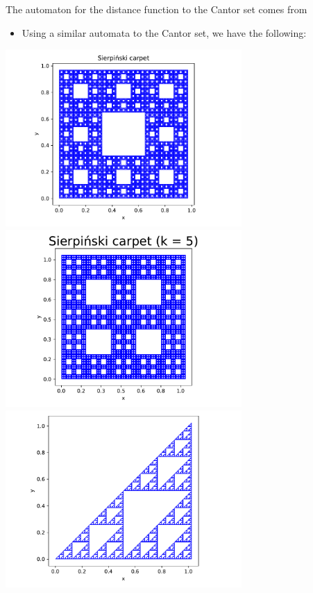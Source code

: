 \documentclass[landscape,usenames,dvipsnames]{sciposter}
\begin{document}
\begin{multicols}{3}
{ \footnotesize The automaton for the distance function to the Cantor set comes from \cite{gorman2019continuous} }

\begin{itemize}
    \item Using a similar automata to the Cantor set, we have the following:
\end{itemize}
    
\begin{center}
    \includegraphics[width=9cm]{FA20/images/fractals/sierpinski-3-l5.pdf}
    \includegraphics[width=9cm]{FA20/images/fractals/sierpinski-5-l3.pdf}
    \includegraphics[width=9cm]{FA20/images/fractals/pascal2.pdf} \\

\end{center}
\end{multicols}
\end{document}
